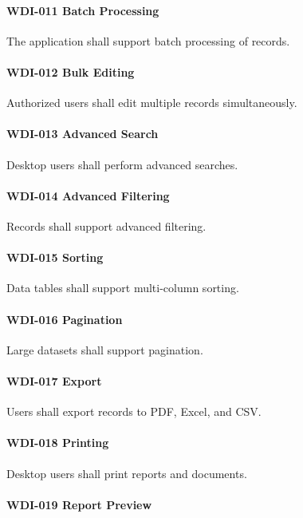 \paragraph{WDI-011 Batch Processing}

The application shall support batch processing of records.

\paragraph{WDI-012 Bulk Editing}

Authorized users shall edit multiple records simultaneously.

\paragraph{WDI-013 Advanced Search}

Desktop users shall perform advanced searches.

\paragraph{WDI-014 Advanced Filtering}

Records shall support advanced filtering.

\paragraph{WDI-015 Sorting}

Data tables shall support multi-column sorting.

\paragraph{WDI-016 Pagination}

Large datasets shall support pagination.

\paragraph{WDI-017 Export}

Users shall export records to PDF, Excel, and CSV.

\paragraph{WDI-018 Printing}

Desktop users shall print reports and documents.

\paragraph{WDI-019 Report Preview}

